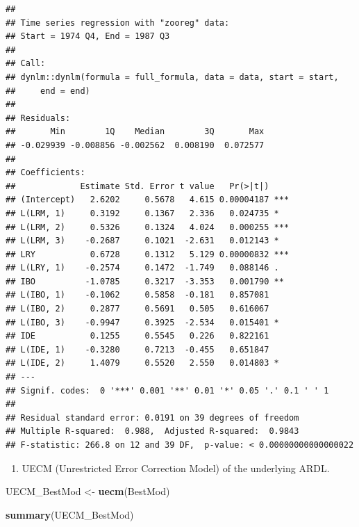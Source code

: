 \documentclass[
]{book}
\newenvironment{Shaded}{\begin{snugshade}}{\end{snugshade}}
\newcommand{\FunctionTok}[1]{\textcolor[rgb]{0.13,0.29,0.53}{\textbf{#1}}}
\newcommand{\NormalTok}[1]{#1}
\newcommand{\OtherTok}[1]{\textcolor[rgb]{0.56,0.35,0.01}{#1}}
\providecommand{\tightlist}{%
  \setlength{\itemsep}{0pt}\setlength{\parskip}{0pt}}
\begin{document}
\begin{verbatim}
## 
## Time series regression with "zooreg" data:
## Start = 1974 Q4, End = 1987 Q3
## 
## Call:
## dynlm::dynlm(formula = full_formula, data = data, start = start, 
##     end = end)
## 
## Residuals:
##       Min        1Q    Median        3Q       Max 
## -0.029939 -0.008856 -0.002562  0.008190  0.072577 
## 
## Coefficients:
##             Estimate Std. Error t value   Pr(>|t|)    
## (Intercept)   2.6202     0.5678   4.615 0.00004187 ***
## L(LRM, 1)     0.3192     0.1367   2.336   0.024735 *  
## L(LRM, 2)     0.5326     0.1324   4.024   0.000255 ***
## L(LRM, 3)    -0.2687     0.1021  -2.631   0.012143 *  
## LRY           0.6728     0.1312   5.129 0.00000832 ***
## L(LRY, 1)    -0.2574     0.1472  -1.749   0.088146 .  
## IBO          -1.0785     0.3217  -3.353   0.001790 ** 
## L(IBO, 1)    -0.1062     0.5858  -0.181   0.857081    
## L(IBO, 2)     0.2877     0.5691   0.505   0.616067    
## L(IBO, 3)    -0.9947     0.3925  -2.534   0.015401 *  
## IDE           0.1255     0.5545   0.226   0.822161    
## L(IDE, 1)    -0.3280     0.7213  -0.455   0.651847    
## L(IDE, 2)     1.4079     0.5520   2.550   0.014803 *  
## ---
## Signif. codes:  0 '***' 0.001 '**' 0.01 '*' 0.05 '.' 0.1 ' ' 1
## 
## Residual standard error: 0.0191 on 39 degrees of freedom
## Multiple R-squared:  0.988,  Adjusted R-squared:  0.9843 
## F-statistic: 266.8 on 12 and 39 DF,  p-value: < 0.00000000000000022
\end{verbatim}

\begin{enumerate}
\def\labelenumi{\arabic{enumi}.}
\setcounter{enumi}{1}
\tightlist
\item
  UECM (Unrestricted Error Correction Model) of the underlying ARDL.
\end{enumerate}

\begin{Shaded}
\begin{Highlighting}[]
\NormalTok{UECM\_BestMod }\OtherTok{\textless{}{-}} \FunctionTok{uecm}\NormalTok{(BestMod)}

\FunctionTok{summary}\NormalTok{(UECM\_BestMod)}
\end{Highlighting}
\end{Shaded}
\end{document}
